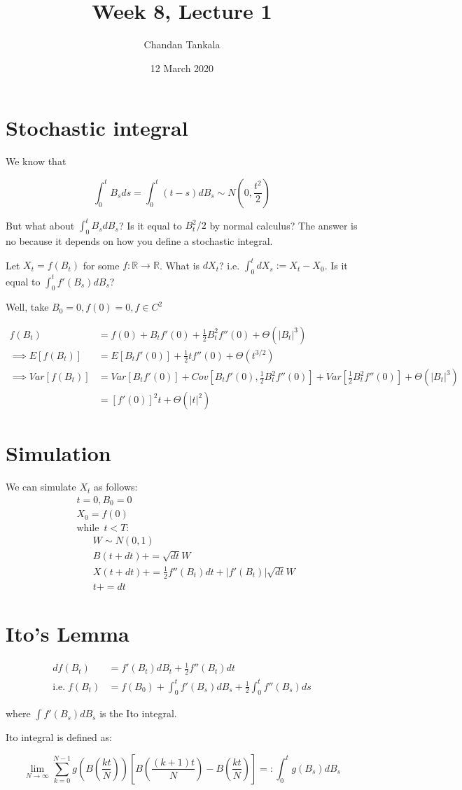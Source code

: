 \documentclass{article}
\title{Week 8, Lecture 1}
\author{Chandan Tankala}
\date{12 March 2020}
\begin{document}
\maketitle
\section{Stochastic integral}
We know that 

$$\int_0^t B_sds = \int_0^t (t-s)dB_s \sim N\left(0,\frac{t^2}{2}\right)$$

But what about $\int_0^t B_sdB_s$? Is it equal to $B_t^2/2$ by normal calculus? The answer is no because it depends on how you define a stochastic integral.

Let $X_t = f(B_t)$ for some $f:\mathbb{R}\to \mathbb{R}$. What is $dX_t$? i.e. $\int_0^t dX_s:= X_t - X_0$. Is it equal to $\int_0^t f'(B_s)dB_s$? 

Well, take $B_0 = 0, f(0)=0, f\in C^2$

\begin{align}
    f(B_t) &= f(0) + B_tf'(0) + \frac{1}{2}B_t^2f''(0)+\Theta(|B_t|^3) \\
    \implies E[f(B_t)] &= E[B_tf'(0)] + \frac{1}{2}tf''(0) + \Theta(t^{3/2}) \\
    \implies Var[f(B_t)] &= Var[B_tf'(0)] + Cov[B_tf'(0),\frac{1}{2}B_t^2f''(0)]+Var[\frac{1}{2}B_t^2f''(0)] + \Theta(|B_t|^3) \\
    &= [f'(0)]^2t + \Theta(|t|^2)
\end{align}

\section{Simulation}
We can simulate $X_t$ as follows:\\
$$
\begin{align}
    & t=0, B_0 = 0 \\
    & X_0 = f(0) \\
    & \text{while}\:\; t<T: \\
    &\;\;\;\;\;\; W\sim N(0,1) \\
    &\;\;\;\;\;\;  B(t+dt) += \sqrt{dt}W \\
    &\;\;\;\;\;\;  X(t+dt) += \frac{1}{2}f''(B_t)dt+|f'(B_t)|\sqrt{dt}W \\
    &\;\;\;\;\;\;  t += dt
\end{align}
$$

\section{Ito's Lemma}

\begin{align}
    df(B_t) &= f'(B_t)dB_t + \frac{1}{2}f''(B_t)dt \\
    \text{i.e.}\; f(B_t) &= f(B_0) + \int_0^t f'(B_s)dB_s + \frac{1}{2}\int_0^t f''(B_s)ds
\end{align}

where $\int f'(B_s)dB_s$ is the Ito integral.

Ito integral is defined as: 

$$\lim_{N\to \infty} \sum_{k=0}^{N-1}g\left( B\left(\frac{kt}{N} \right) \right)\left[ B\left(\frac{(k+1)t}{N} \right) - B\left(\frac{kt}{N} \right) \right] =: \int_0^tg(B_s)dB_s$$
\end{document}
